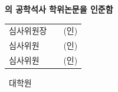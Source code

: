 \begin{titlepage}
\begin{center}
\vspace*{30mm}
{\Large\bfseries \AuthorKo 의 공학석사 학위논문을 인준함\par}
\vspace{40mm}
\renewcommand{\arraystretch}{2.6}
\begin{tabular}{l p{55mm} l}
심사위원장 & \hrulefill & (인) \\
심사위원   & \hrulefill & (인) \\
심사위원   & \hrulefill & (인) \\
\end{tabular}
\vfill
{\large \UniversityKo\ 대학원\par}
\vspace{4mm}
{\large \DegreeDate\par}
\vspace*{10mm}
\end{center}
\end{titlepage}
